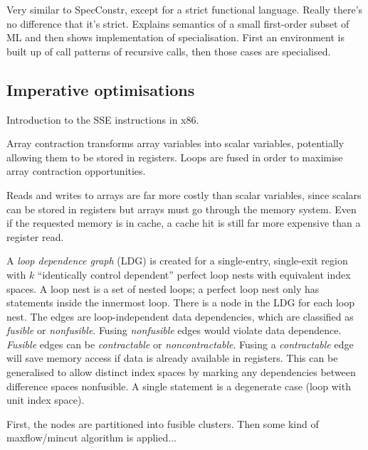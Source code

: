 Very similar to SpecConstr, except for a strict functional language.
Really there's no difference that it's strict.
Explains semantics of a small first-order subset of ML and then shows implementation of specialisation.
First an environment is built up of call patterns of recursive calls, then those cases are specialised.




\subsection{Imperative optimisations}

Introduction to the SSE instructions in x86.

Array contraction transforms array variables into scalar variables,
potentially allowing them to be stored in registers.
Loops are fused in order to maximise array contraction opportunities.

Reads and writes to arrays are far more costly than scalar variables, since
scalars can be stored in registers but arrays must go through the memory system.
Even if the requested memory is in cache, a cache hit is still far more expensive than a register read.

A \emph{loop dependence graph} (LDG) is created for a single-entry, single-exit region with $k$ ``identically control dependent'' perfect loop nests with equivalent index spaces.
A loop nest is a set of nested loops; a perfect loop nest only has statements inside the innermost loop.
There is a node in the LDG for each loop nest.
The edges are loop-independent data dependencies, which are classified as \emph{fusible} or \emph{nonfusible}.
Fusing \emph{nonfusible} edges would violate data dependence. \emph{Fusible} edges can be \emph{contractable} or \emph{noncontractable}.
Fusing a \emph{contractable} edge will save memory access if data is already available in registers.
This can be generalised to allow distinct index spaces by marking any dependencies between difference spaces nonfusible. A single statement is a degenerate case (loop with unit index space).

First, the nodes are partitioned into fusible clusters. Then some kind of maxflow/mincut algorithm is applied...


